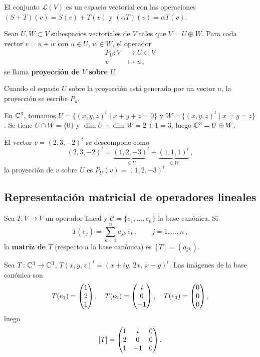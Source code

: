\begin{prop}
  El conjunto $\mathcal{L}(V)$ es un espacio vectorial con las operaciones $(S+T)(v)=S(v)+T(v)$ y $(\alpha T)(v)=\alpha T(v)$.
\end{prop}

\begin{defi}[Proyección]
  Sean $U,W \subset V$ subespacios vectoriales de $V$ tales que $V=U\oplus W$. Para cada vector $v=u+w$ con $u\in U$, $w\in W$, el operador
  \begin{align*}
    P_U\colon V & \to U\subset V \\
    v           & \mapsto u\,,
  \end{align*} se llama \textbf{proyección de $V$ sobre $U$}.
\end{defi}
Cuando el espacio $U$ sobre la proyección está generado por un vector $u$, la proyección se escribe $P_u$.
\begin{eje}
  En $\mathbb{C}^3$, tomamos $U=\{(x,y,z)^t\mid x+y+z=0\}$ y $W=\{(x,y,z)^t\mid x=y=z\}$. Se tiene $U\cap W=\{0\}$ y $\dim U+\dim W=2+1=3$, luego $\mathbb{C}^3=U\oplus W$.

  El vector $v=(2,3,-2)^t$ se descompone como
  \[
    (2,3,-2)^t = \underbrace{(1,2,-3)^t}_{\in U} + \underbrace{(1,1,1)^t}_{\in W}\,,
  \]
  la proyección de $v$ sobre $U$ es $P_U(v)=(1,2,-3)^t$.
\end{eje}

\subsection{Representación matricial de operadores lineales}

\begin{defi}
  Sea $T\colon V\to V$ un operador lineal y $\mathcal{C}=\{e_1,\ldots,e_n\}$ la base canónica. Si
  \[
    T(e_j) = \sum_{k=1}^n a_{jk}\,e_k\,,\qquad j=1,\ldots,n\,,
  \]
  la \textbf{matriz de $T$} (respecto a la base canónica) es $[T]=(a_{jk})$.
\end{defi}

\begin{eje}
  Sea $T\colon\mathbb{C}^3\to\mathbb{C}^3$, $T(x,y,z)^t=(x+iy,\,2x,\,x-y)^t$. Las imágenes de la base canónica son
  \[
    T(e_1)=\mqty(1\\2\\1)\,,\quad T(e_2)=\mqty(i\\0\\-1)\,,\quad T(e_3)=\mqty(0\\0\\0)\,,
  \]
  luego
  \[
    [T] = \mqty(1 & i & 0 \\ 2 & 0 & 0 \\ 1 & -1 & 0)\,.
  \]
\end{eje}

